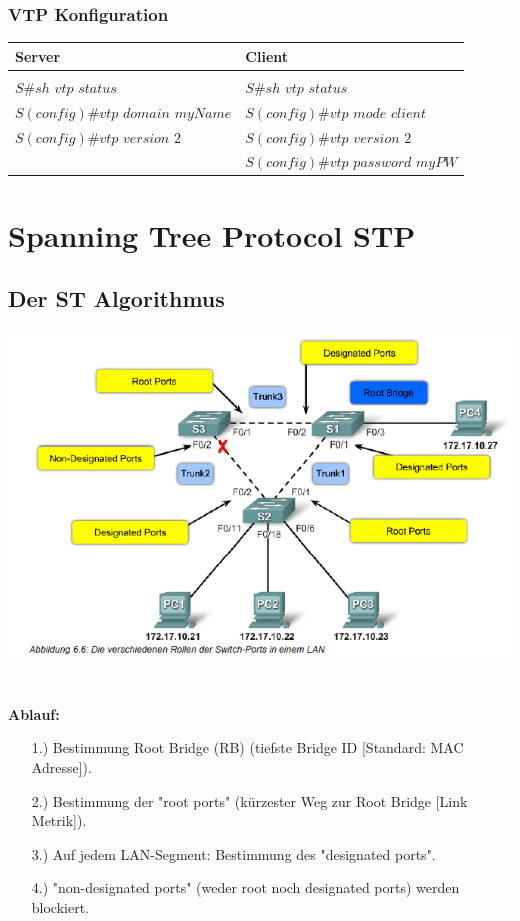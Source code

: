 \documentclass[landscape,twocolumn,a4paper]{article}
\begin{document}
\begin{footnotesize}
\subsubsection{VTP Konfiguration}
\begin{tabular}{l | l}
	\textbf{Server} & \textbf{Client} \\
	\hline \\
	$S\#sh$ $vtp$ $status$ & $S\#sh$ $vtp$ $status$ \\
	$S(config)\#vtp$ $domain$ $myName$ & $S(config)\#vtp$ $mode$ $client$ \\
	$S(config)\#vtp$ $version$ $2$ & $S(config)\#vtp$ $version$ $2$ \\
	 & $S(config)\#vtp$ $password$ $myPW$
\end{tabular}


\section{Spanning Tree Protocol STP}
\subsection{Der ST Algorithmus}
\includegraphics[scale=0.40]{stp.png}\\\\\\
\textbf{Ablauf:}
\begin{itemize}
	\item[1.)] Bestimmung Root Bridge (RB) (tiefste Bridge ID [Standard: MAC Adresse]).
	\item[2.)] Bestimmung der "root ports" (kürzester Weg zur Root Bridge [Link Metrik]).
	\item[3.)] Auf jedem LAN-Segment: Bestimmung des "designated ports".
	\item[4.)] "non-designated ports" (weder root noch designated ports) werden blockiert.
\end{itemize}


\end{footnotesize}
\end{document}

